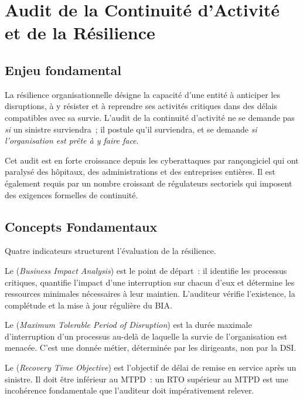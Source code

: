 \section{Audit de la Continuité d'Activité et de la Résilience}
\label{sec:audit-continuite}

\subsection{Enjeu fondamental}

La résilience organisationnelle désigne la capacité d'une entité à anticiper les
disruptions, à y résister et à reprendre ses activités critiques dans des délais
compatibles avec sa survie. L'audit de la continuité d'activité ne se demande pas
\textit{si} un sinistre surviendra~; il postule qu'il surviendra, et se demande
\textit{si l'organisation est prête à y faire face}.

Cet audit est en forte croissance depuis les cyberattaques par rançongiciel qui ont
paralysé des hôpitaux, des administrations et des entreprises entières. Il est
également requis par un nombre croissant de régulateurs sectoriels qui imposent des
exigences formelles de continuité.

\subsection{Concepts Fondamentaux}

Quatre indicateurs structurent l'évaluation de la résilience.

Le  (\textit{Business Impact Analysis}) est le point de départ~: il
identifie les processus critiques, quantifie l'impact d'une interruption sur chacun
d'eux et détermine les ressources minimales nécessaires à leur maintien. L'auditeur
vérifie l'existence, la complétude et la mise à jour régulière du BIA.

Le  (\textit{Maximum Tolerable Period of Disruption}) est la durée
maximale d'interruption d'un processus au-delà de laquelle la survie de l'organisation
est menacée. C'est une donnée métier, déterminée par les dirigeants, non par la DSI.

Le  (\textit{Recovery Time Objective}) est l'objectif de délai de
remise en service après un sinistre. Il doit être inférieur au MTPD~: un RTO supérieur
au MTPD est une incohérence fondamentale que l'auditeur doit impérativement relever.

